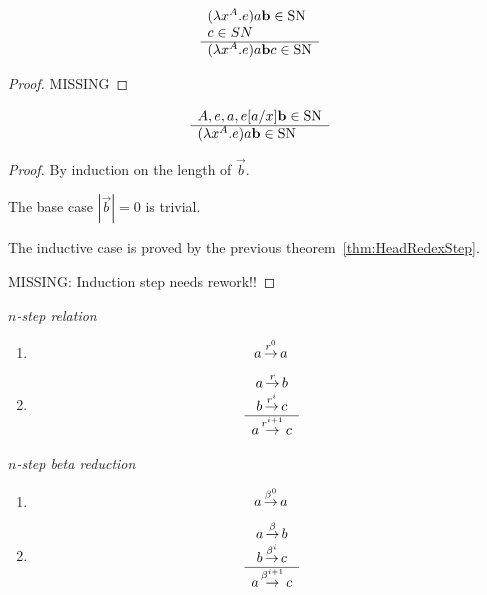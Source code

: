 \begin{theorem}
    \label{thm:HeadRedexStep}
    $$
    \begin{array}{l} 
        (\lambda x^A. e) a {\mathbf b} \in {\text{SN}}
        \\
        c \in SN
     \\ \hline 
        (\lambda x^A. e) a {\mathbf b} c \in {\text{SN}}
    \end{array}
    $$
    \begin{proof}
        MISSING
    \end{proof}
\end{theorem}





\begin{theorem}
    \label{thm:StronglyNormalizingRedex}
    $$
    \begin{array}{l} 
        A, e, a, e[a/x] {\mathbf b}  \in {\text{SN}}
     \\ \hline 
        (\lambda x^A. e) a {\mathbf b} \in {\text{SN}}
    \end{array}
    $$
    \begin{proof} By induction on the length of $\vec b$.

        The base case $|\vec b| = 0$ is trivial.

        The inductive case is proved by the previous
        theorem~\ref{thm:HeadRedexStep}.

        MISSING: Induction step needs rework!!
    \end{proof}
\end{theorem}







\begin{definition}
    \emph{$n$-step relation}
    \begin{enumerate}
        \item $$ a {{\,\stackrel{{r}^{0}}{\to}\,}} a$$

        \item $$
            \begin{array}{c} 
                a {\,\stackrel{r}{\to}\,} b
                \\
                b {{\,\stackrel{{r}^{i}}{\to}\,}} c
             \\ \hline 
                a {{\,\stackrel{{r}^{i+1}}{\to}\,}} c
            \end{array}
            $$
    \end{enumerate}
\end{definition}






\begin{definition}
    \emph{$n$-step beta reduction}
    \begin{enumerate}
        \item $$ a {{{\,\stackrel{{\beta}^{0}}{\to}\,}}} a$$

        \item $$
            \begin{array}{c} 
                a {\,\stackrel{\beta}{\to}\,} b
                \\
                b {{{\,\stackrel{{\beta}^{i}}{\to}\,}}} c
             \\ \hline 
                a {{{\,\stackrel{{\beta}^{i+1}}{\to}\,}}} c
            \end{array}
            $$
    \end{enumerate}
\end{definition}


